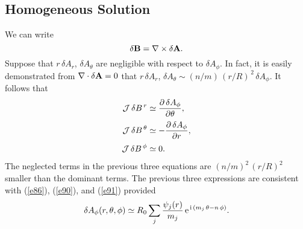 \documentclass[notitlepage,12pt]{article}
\begin{document}
\subsection{Homogeneous Solution}
We can write
\begin{equation}
\delta {\bf B} = \nabla \times \delta {\bf A}.
\end{equation}
Suppose that $r\,\delta A_r$, $\delta A_\theta$ are negligible with respect to
$\delta A_\phi$. In fact, it is easily demonstrated from $\nabla\cdot\delta {\bf A}=0$ that $r\,\delta A_r$, $\delta A_\theta\sim (n/m)\,(r/R)^{\,2}\,\delta A_\phi$. 
 It follows that
\begin{align}
{\cal  J}\,\delta B^{\,r} &\simeq \frac{\partial\,\delta A_\phi}{\partial\theta},\\[0.5ex]
{\cal J}\,\delta B^{\,\theta} &\simeq - \frac{\partial\,\delta A_\phi}{\partial r},\\[0.5ex]
{\cal J}\,\delta B^{\,\phi} &\simeq 0.
\end{align}
The neglected terms in the previous three equations are $(n/m)^2\,(r/R)^2$ smaller than the dominant terms. 
The previous three expressions are consistent with (\ref{e86}), (\ref{e90}), and (\ref{e91}) provided
\begin{equation}
\delta A_\phi(r,\theta,\phi) \simeq R_0\sum_j\frac{\psi_j(r)}{m_j} \,{\rm e}^{\,{\rm i}\,(m_j\,\theta-n\,\phi)}.\label{e112}
\end{equation}
\end{document}
